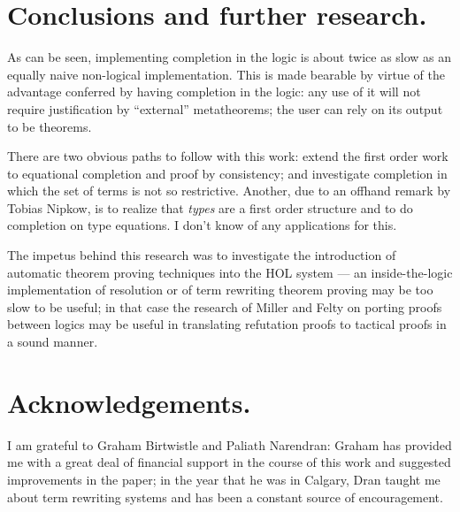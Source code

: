 \section{Conclusions and further research.}

As can be seen, implementing completion in the logic is about twice as
slow as an equally naive non-logical implementation. This is made
bearable by virtue of the advantage conferred by having completion in
the logic: any use of it will not require justification by ``external''
metatheorems; the user can rely on its output to be theorems.

There are two obvious paths to follow with this work: extend the first order
work to equational completion and proof by consistency; and investigate
completion in which the set of terms is not so restrictive. Another, due to an
offhand remark by Tobias Nipkow, is to realize that {\em types} are a first
order structure and to do completion on type equations. I don't know of any
applications for this.

The impetus behind this research was to investigate the introduction of
automatic theorem proving techniques into the HOL system --- an
inside-the-logic implementation of resolution or of term rewriting theorem
proving \cite{hsder83} may be too slow to be useful; in that case the research
of Miller and Felty \cite{millersl,felty86} on porting proofs between logics
may be useful in translating refutation proofs to tactical proofs in a sound
manner.


\section*{Acknowledgements.}

I am grateful to Graham Birtwistle and Paliath Narendran: Graham has
provided me with a great deal of financial support in the course of this
work and suggested improvements in the paper; in the year that he was in
Calgary, Dran taught me about term rewriting systems and has been a
constant source of encouragement.

